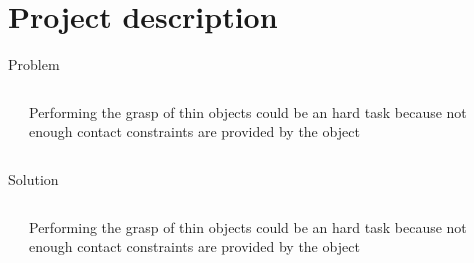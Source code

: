 \section{Project description}
\begin{frame}{Problem}
  \begin{columns}
    \begin{column}{0.5\textwidth}
    \end{column}
    \begin{column}{0.5\textwidth}
      Performing the grasp of thin objects could be an hard task
      because not enough contact constraints are provided by the object
    \end{column}
  \end{columns}
\end{frame}

\begin{frame}{Solution}
  \begin{columns}
    \begin{column}{0.5\textwidth}
    \end{column}
    \begin{column}{0.5\textwidth}
      Performing the grasp of thin objects could be an hard task
      because not enough contact constraints are provided by the object
    \end{column}
  \end{columns}
\end{frame}

